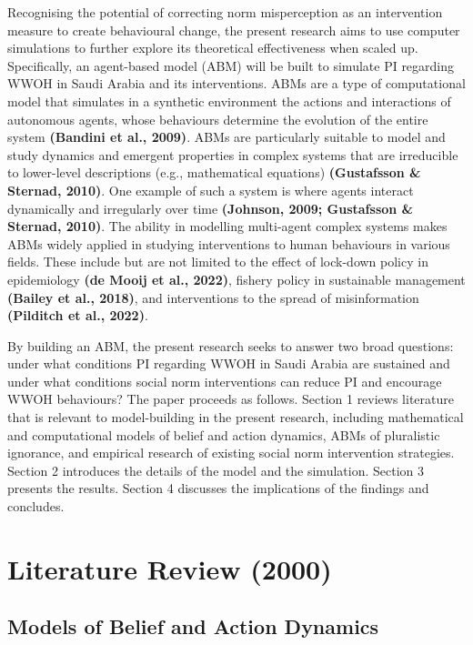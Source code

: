 \documentclass[
  11pt,
]{article}
\begin{document}
Recognising the potential of correcting norm misperception as an
intervention measure to create behavioural change, the present research
aims to use computer simulations to further explore its theoretical
effectiveness when scaled up. Specifically, an agent-based model (ABM)
will be built to simulate PI regarding WWOH in Saudi Arabia and its
interventions. ABMs are a type of computational model that simulates in
a synthetic environment the actions and interactions of autonomous
agents, whose behaviours determine the evolution of the entire system
\textbf{(Bandini et al., 2009)}. ABMs are particularly suitable to model
and study dynamics and emergent properties in complex systems that are
irreducible to lower-level descriptions (e.g., mathematical equations)
\textbf{(Gustafsson \& Sternad, 2010)}. One example of such a system is
where agents interact dynamically and irregularly over time
\textbf{(Johnson, 2009; Gustafsson \& Sternad, 2010)}. The ability in
modelling multi-agent complex systems makes ABMs widely applied in
studying interventions to human behaviours in various fields. These
include but are not limited to the effect of lock-down policy in
epidemiology \textbf{(de Mooij et al., 2022)}, fishery policy in
sustainable management \textbf{(Bailey et al., 2018)}, and interventions
to the spread of misinformation \textbf{(Pilditch et al., 2022)}.

By building an ABM, the present research seeks to answer two broad
questions: under what conditions PI regarding WWOH in Saudi Arabia are
sustained and under what conditions social norm interventions can reduce
PI and encourage WWOH behaviours? The paper proceeds as follows. Section
1 reviews literature that is relevant to model-building in the present
research, including mathematical and computational models of belief and
action dynamics, ABMs of pluralistic ignorance, and empirical research
of existing social norm intervention strategies. Section 2 introduces
the details of the model and the simulation. Section 3 presents the
results. Section 4 discusses the implications of the findings and
concludes.

\hypertarget{literature-review-2000}{%
\section{Literature Review (2000)}\label{literature-review-2000}}

\hypertarget{models-of-belief-and-action-dynamics}{%
\subsection{Models of Belief and Action
Dynamics}\label{models-of-belief-and-action-dynamics}}
\end{document}
